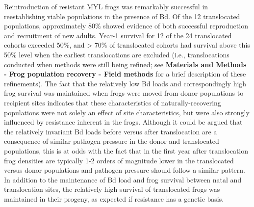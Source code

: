\documentclass[
  letterpaper,
  DIV=11,
  numbers=noendperiod]{scrartcl}
\begin{document}
Reintroduction of resistant MYL frogs was remarkably successful in
reestablishing viable populations in the presence of Bd. Of the 12
translocated populations, approximately 80\% showed evidence of both
successful reproduction and recruitment of new adults. Year-1 survival
for 12 of the 24 translocated cohorts exceeded 50\%, and \textgreater{}
70\% of translocated cohorts had survival above this 50\% level when the
earliest translocations are excluded (i.e., translocations conducted
when methods were still being refined; see \textbf{Materials and Methods
- Frog population recovery - Field methods} for a brief description of
these refinements). The fact that the relatively low Bd loads and
correspondingly high frog survival was maintained when frogs were moved
from donor populations to recipient sites indicates that these
characteristics of naturally-recovering populations were not solely an
effect of site characteristics, but were also strongly influenced by
resistance inherent in the frogs. Although it could be argued that the
relatively invariant Bd loads before versus after translocation are a
consequence of similar pathogen pressure in the donor and translocated
populations, this is at odds with the fact that in the first year after
translocation frog densities are typically 1-2 orders of magnitude lower
in the translocated versus donor populations and pathogen pressure
should follow a similar pattern. In addition to the maintenance of Bd
load and frog survival between natal and translocation sites, the
relatively high survival of translocated frogs was maintained in their
progeny, as expected if resistance has a genetic basis.
\end{document}
